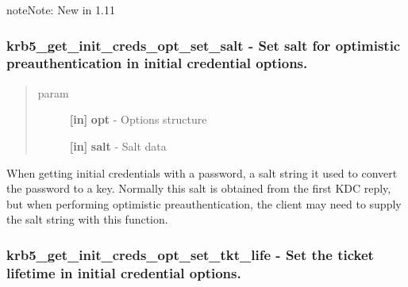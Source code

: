 \documentclass[letterpaper,10pt,english]{sphinxmanual}
\begin{document}
\begin{notice}{note}{Note:}
New in 1.11
\end{notice}


\subsubsection{krb5\_get\_init\_creds\_opt\_set\_salt -  Set salt for optimistic preauthentication in initial credential options.}
\label{appdev/refs/api/krb5_get_init_creds_opt_set_salt:krb5-get-init-creds-opt-set-salt-set-salt-for-optimistic-preauthentication-in-initial-credential-options}\label{appdev/refs/api/krb5_get_init_creds_opt_set_salt::doc}

\begin{fulllineitems}
\label{appdev/refs/api/krb5_get_init_creds_opt_set_salt:c.krb5_get_init_creds_opt_set_salt}
\end{fulllineitems}

\begin{quote}\begin{description}
\item[{param}] \leavevmode
\textbf{{[}in{]}} \textbf{opt} - Options structure

\textbf{{[}in{]}} \textbf{salt} - Salt data

\end{description}\end{quote}

When getting initial credentials with a password, a salt string it used to convert the password to a key. Normally this salt is obtained from the first KDC reply, but when performing optimistic preauthentication, the client may need to supply the salt string with this function.


\subsubsection{krb5\_get\_init\_creds\_opt\_set\_tkt\_life -  Set the ticket lifetime in initial credential options.}
\label{appdev/refs/api/krb5_get_init_creds_opt_set_tkt_life:krb5-get-init-creds-opt-set-tkt-life-set-the-ticket-lifetime-in-initial-credential-options}\label{appdev/refs/api/krb5_get_init_creds_opt_set_tkt_life::doc}
\end{document}
